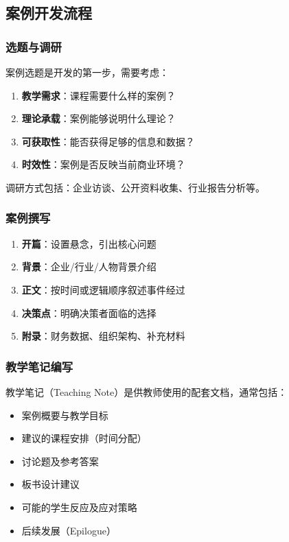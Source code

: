 \documentclass[12pt,a4paper]{ctexart}
\begin{document}
\subsection{案例开发流程}

\subsubsection{选题与调研}

案例选题是开发的第一步，需要考虑：
\begin{enumerate}[leftmargin=2em]
    \item \textbf{教学需求}：课程需要什么样的案例？
    \item \textbf{理论承载}：案例能够说明什么理论？
    \item \textbf{可获取性}：能否获得足够的信息和数据？
    \item \textbf{时效性}：案例是否反映当前商业环境？
\end{enumerate}

调研方式包括：企业访谈、公开资料收集、行业报告分析等。

\subsubsection{案例撰写}

\begin{methodbox}[案例文本结构]
\begin{enumerate}[leftmargin=2em]
    \item \textbf{开篇}：设置悬念，引出核心问题
    \item \textbf{背景}：企业/行业/人物背景介绍
    \item \textbf{正文}：按时间或逻辑顺序叙述事件经过
    \item \textbf{决策点}：明确决策者面临的选择
    \item \textbf{附录}：财务数据、组织架构、补充材料
\end{enumerate}
\end{methodbox}

\subsubsection{教学笔记编写}

教学笔记（Teaching Note）是供教师使用的配套文档，通常包括：
\begin{itemize}[leftmargin=2em]
    \item 案例概要与教学目标
    \item 建议的课程安排（时间分配）
    \item 讨论题及参考答案
    \item 板书设计建议
    \item 可能的学生反应及应对策略
    \item 后续发展（Epilogue）
\end{itemize}
\end{document}
